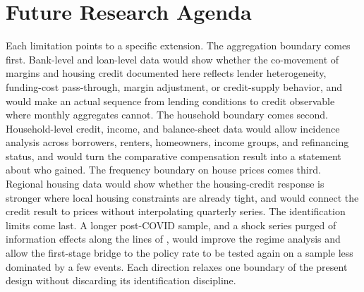 \section{Future Research Agenda}
\label{sec:future-research}

Each limitation points to a specific extension. The aggregation boundary comes first. Bank-level and loan-level data would show whether the co-movement of margins and housing credit documented here reflects lender heterogeneity, funding-cost pass-through, margin adjustment, or credit-supply behavior, and would make an actual sequence from lending conditions to credit observable where monthly aggregates cannot. The household boundary comes second. Household-level credit, income, and balance-sheet data would allow incidence analysis across borrowers, renters, homeowners, income groups, and refinancing status, and would turn the comparative compensation result into a statement about who gained. The frequency boundary on house prices comes third. Regional housing data would show whether the housing-credit response is stronger where local housing constraints are already tight, and would connect the credit result to prices without interpolating quarterly series. The identification limits come last. A longer post-COVID sample, and a shock series purged of information effects along the lines of \textcite{JarocinskiKaradi2020}, would improve the regime analysis and allow the first-stage bridge to the policy rate to be tested again on a sample less dominated by a few events. Each direction relaxes one boundary of the present design without discarding its identification discipline.
